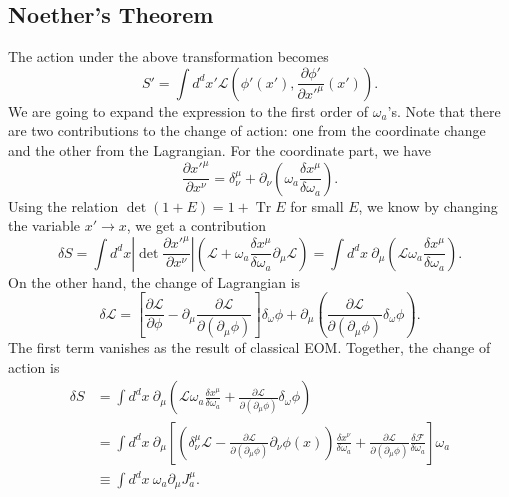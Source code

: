 \documentclass[aps,prb,superscriptaddress,nofootinbib]{revtex4}
\def \Tr{\operatorname{Tr}}
\begin{document}
\subsection{Noether's Theorem}
The action under the above transformation becomes
\begin{equation}
	S' = \int d^d x' \mathcal L\left(\phi'(x'),\frac{\partial \phi'}{\partial {x'}^\mu}(x')\right).
\end{equation}
We are going to expand the expression to the first order of $\omega_a$'s.
Note that there are two contributions to the change of action: one from the coordinate change and the other from the Lagrangian.
For the coordinate part, we have
\begin{equation}
	\frac{\partial {x'}^\mu}{\partial x^\nu}
	= \delta^\mu_\nu + \partial_\nu\left(\omega_a \frac{\delta x^\mu}{\delta \omega_a}\right).
\end{equation}
Using the relation $\det(1+E) = 1 + \Tr E$ for small $E$, we know by changing the variable $x' \rightarrow x$, we get a contribution
\begin{equation}
	\delta S 
	= \int d^d x \left|\det \frac{\partial {x'}^\mu}{\partial x^\nu}\right|\left(\mathcal L + \omega_a \frac{\delta x^\mu}{\delta \omega_a} \partial_\mu \mathcal L \right)  
	= \int d^d x \ \partial_\mu \left(\mathcal L \omega_a \frac{\delta x^\mu}{\delta \omega_a}\right).
\end{equation}
On the other hand, the change of Lagrangian is
\begin{equation}
	{\delta} \mathcal L =
	\left[\frac{\partial \mathcal L}{\partial \phi} -\partial_\mu \frac{\partial\mathcal L}{\partial(\partial_\mu\phi)} \right]\delta_\omega \phi + \partial_\mu \left(\frac{\partial\mathcal L}{\partial(\partial_\mu\phi)} \delta_\omega \phi \right).
\end{equation}
The first term vanishes as the result of classical EOM.
Together, the change of action is
\begin{equation}
\begin{aligned}
	\delta S 
	&= \int d^d x \ \partial_\mu \left(\mathcal L \omega_a \frac{\delta x^\mu}{\delta \omega_a}+\frac{\partial\mathcal L}{\partial(\partial_\mu\phi)} \delta_\omega \phi \right) \\
	&= \int d^d x \ \partial_\mu \left[\left(\delta^\mu_\nu \mathcal L - \frac{\partial\mathcal L}{\partial(\partial_\mu\phi)}\partial_\nu \phi(x) \right)\frac{\delta x^\nu}{\delta\omega_a}  + \frac{\partial\mathcal L}{\partial(\partial_\mu\phi)}\frac{\delta\mathcal F}{\delta\omega_a}\right] \omega_a \\
	&\equiv \int d^d x \ \omega_a  \partial_\mu J^\mu_a.
\end{aligned} 
\end{equation}
\end{document}
